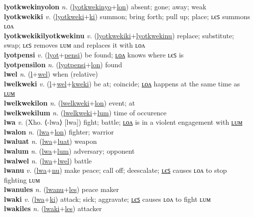 \textbf{lyotkwekinyolon} \textit{n.} (\hyperref[lyotkwekinyo]{lyotkwekinyo}+\hyperref[lon]{lon})
absent; gone; away; weak \label{lyotkwekinyolon} \\
\textbf{lyotkwekiki} \textit{v.} (\hyperref[lyotkweki]{lyotkweki}+\hyperref[ki]{ki})
summon; bring forth; pull up; place; ʟєꜱ summons ʟᴏᴧ \label{lyotkwekiki} \\
\textbf{lyotkwekikilyotkwekinu} \textit{v.} (\hyperref[lyotkwekiki]{lyotkwekiki}+\hyperref[lyotkwekinu]{lyotkwekinu})
replace; substitute; swap; ʟєꜱ removes ʟᴜᴍ and replaces it with ʟᴏᴧ \label{lyotkwekikilyotkwekinu} \\
\textbf{lyotpensi} \textit{v.} (\hyperref[lyot]{lyot}+\hyperref[pensi]{pensi})
be found; \hyperref[lyotpensilon]{ʟᴏᴧ} knows where ʟєꜱ is \label{lyotpensi} \\
\textbf{lyotpensilon} \textit{n.} (\hyperref[lyotpensi]{lyotpensi}+\hyperref[lon]{lon})
found \label{lyotpensilon} \\
\textbf{lwel} \textit{n.} (\hyperref[l]{l}+\hyperref[el]{wel})
when (relative) \label{lwel} \\
\textbf{lwelkweki} \textit{v.} (\hyperref[l]{l}+\hyperref[wel]{wel}+\hyperref[kweki]{kweki})
be at; coincide; \hyperref[lwelkwekilon]{ʟᴏᴧ} happens at the same time as \hyperref[lwelkwekilum]{ʟᴜᴍ} \label{lwelkweki} \\
\textbf{lwelkwekilon} \textit{n.} (\hyperref[lwelkweki]{lwelkweki}+\hyperref[lon]{lon})
event; at \label{lwelkwekilon} \\
\textbf{lwelkwekilum} \textit{n.} (\hyperref[lwelkweki]{lwelkweki}+\hyperref[lum]{lum})
time of occurence \label{lwelkwekilum} \\
\textbf{lwa} \textit{v.} (Xho. ⟨-lwa⟩ [lwa])
fight; battle; \hyperref[lwalon]{ʟᴏᴧ} is in a violent engagement with \hyperref[lwalum]{ʟᴜᴍ} \label{lwa} \\
\textbf{lwalon} \textit{n.} (\hyperref[lwa]{lwa}+\hyperref[lon]{lon})
fighter; warrior \label{lwalon} \\
\textbf{lwaluat} \textit{n.} (\hyperref[lwa]{lwa}+\hyperref[luat]{luat})
weapon \label{lwaluat} \\
\textbf{lwalum} \textit{n.} (\hyperref[lwa]{lwa}+\hyperref[lum]{lum})
adversary; opponent \label{lwalum} \\
\textbf{lwalwel} \textit{n.} (\hyperref[lwa]{lwa}+\hyperref[lwel]{lwel})
battle \label{lwalwel} \\
\textbf{lwanu} \textit{v.} (\hyperref[lwa]{lwa}+\hyperref[nu]{nu})
make peace; call off; deescalate; \hyperref[lwanules]{ʟєꜱ} causes ʟᴏᴧ to stop fighting ʟᴜᴍ \label{lwanu} \\
\textbf{lwanules} \textit{n.} (\hyperref[lwanu]{lwanu}+\hyperref[les]{les})
peace maker \label{lwanules} \\
\textbf{lwaki} \textit{v.} (\hyperref[lwa]{lwa}+\hyperref[ki]{ki})
attack; sick; aggravate; \hyperref[lwakiles]{ʟєꜱ} causes ʟᴏᴧ to fight ʟᴜᴍ \label{lwaki} \\
\textbf{lwakiles} \textit{n.} (\hyperref[lwaki]{lwaki}+\hyperref[les]{les})
attacker \label{lwakiles} \\
